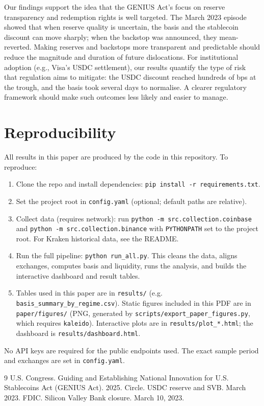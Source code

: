 \documentclass[12pt,oneside,a4paper]{article}
\begin{document}
Our findings support the idea that the GENIUS Act's focus on reserve transparency and redemption rights is well targeted. The March 2023 episode showed that when reserve quality is uncertain, the basis and the stablecoin discount can move sharply; when the backstop was announced, they mean-reverted. Making reserves and backstops more transparent and predictable should reduce the magnitude and duration of future dislocations. For institutional adoption (e.g., Visa's USDC settlement), our results quantify the type of risk that regulation aims to mitigate: the USDC discount reached hundreds of bps at the trough, and the basis took several days to normalise. A clearer regulatory framework should make such outcomes less likely and easier to manage.

\section*{Reproducibility}

All results in this paper are produced by the code in this repository. To reproduce:

\begin{enumerate}
\item Clone the repo and install dependencies: \texttt{pip install -r requirements.txt}.
\item Set the project root in \texttt{config.yaml} (optional; default paths are relative).
\item Collect data (requires network): run \texttt{python -m src.collection.coinbase} and \texttt{python -m src.collection.binance} with \texttt{PYTHONPATH} set to the project root. For Kraken historical data, see the README.
\item Run the full pipeline: \texttt{python run\_all.py}. This cleans the data, aligns exchanges, computes basis and liquidity, runs the analysis, and builds the interactive dashboard and result tables.
\item Tables used in this paper are in \texttt{results/} (e.g. \texttt{basis\_summary\_by\_regime.csv}). Static figures included in this PDF are in \texttt{paper/figures/} (PNG, generated by \texttt{scripts/export\_paper\_figures.py}, which requires \texttt{kaleido}). Interactive plots are in \texttt{results/plot\_*.html}; the dashboard is \texttt{results/dashboard.html}.
\end{enumerate}

No API keys are required for the public endpoints used. The exact sample period and exchanges are set in \texttt{config.yaml}.

\begin{thebibliography}{9}
 U.S. Congress. Guiding and Establishing National Innovation for U.S. Stablecoins Act (GENIUS Act). 2025.
 Circle. USDC reserve and SVB. March 2023.
 FDIC. Silicon Valley Bank closure. March 10, 2023.
\end{thebibliography}
\end{document}
